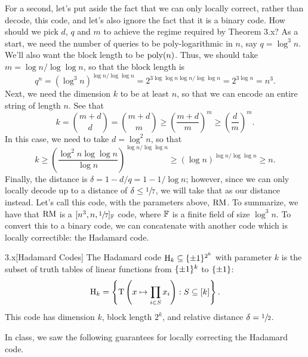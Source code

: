 \documentclass[11pt]{article}
\begin{document}
For a second, let's put aside the fact that we can only locally correct, rather than decode, this code, and let's also ignore the fact that it is a binary code. How should we pick $d$, $q$ and $m$ to achieve the regime required by Theorem 3.x? As a start, we need the number of queries to be poly-logarithmic in $n$, say $q = \log^3 n$. We'll also want the block length to be $\mathrm{poly}(n)$. Thus, we should take $m = \log n / \log \log n$, so that the block length is 
\begin{equation*}
    q^n = \left(\log^3 n\right)^{\log n / \log \log n} = 2^{3\log \log n \log n / \log \log n} = 2^{3\log n} = n^3.
\end{equation*}
Next, we need the dimension $k$ to be at least $n$, so that we can encode an entire string of length $n$. See that 
\begin{equation*}
    k = \binom{m + d}{d} = \binom{m + d}{m} \geq \left(\frac{m + d}{m}\right)^{m} \geq \left(\frac{d}{m}\right)^{m}.
\end{equation*}
In this case, we need to take $d = \log^2 n$, so that 
\begin{equation*}
    k \geq \left(\frac{\log^2 n \log \log n}{\log n}\right)^{\log n / \log \log n} \geq \left(\log n\right)^{\log n / \log \log n} \geq n.
\end{equation*}
Finally, the distance is $\delta = 1 - d / q = 1 - 1 / \log n$; however, since we can only locally decode up to a distance of $\delta \leq \sfrac{1}{7}$, we will take that as our distance instead. Let's call this code, with the parameters above, $\mathrm{RM}$. To summarize, we have that $\mathrm{RM}$ is a $[n^3, n, \sfrac{1}{7}]_{\mathbb{F}}$ code, where $\mathbb{F}$ is a finite field of size $\log^3 n$. To convert this to a binary code, we can concatenate with another code which is locally correctible: the Hadamard code.

\begin{definition}{3.x}[Hadamard Codes]
    The Hadamard code $\mathrm{H}_k \subseteq \{\pm 1\}^{2^k}$ with parameter $k$ is the subset of truth tables of linear functions from $\{\pm 1\}^k$ to $\{\pm 1\}$:
    \begin{equation*}
        \mathrm{H}_k = \left\{\mathrm{T}\left(x \mapsto \prod_{i \in S} x_i\right) : S \subseteq [k]\right\}.
    \end{equation*} 
    This code has dimension $k$, block length $2^k$, and relative distance $\delta = \sfrac{1}{2}$.
\end{definition}

In class, we saw the following guarantees for locally correcting the Hadamard code.
\end{document}
